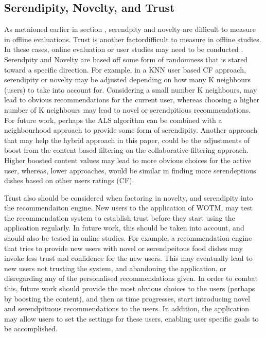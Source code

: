 \subsection{Serendipity, Novelty, and Trust}
As metnioned earlier in section , serendpity and novelty are difficult to measure in offline evaluations. Trust is another factordifficult to measure in offline studies. In these cases, online evaluation or user studies may need to be conducted . Serendpity and Novelty are based off some form of randomness that is stared toward a specific direction. For example, in a KNN user based CF approach, serendipity or novelty may be adjusted depending on how many K neighbours (users) to take into account for. Considering a small number K neighbours, may lead to obvious recommendations for the current user, whereas choosing a higher number of K neighbours may lead to novel or serendpitious recommendations. For future work, perhaps the ALS algorithm can be combined with a neighbourhood approach to provide some form of serendipity. Another approach that may help the hybrid approach in this paper, could be the adjustments of boost from the content-based filtering on the collaborative filtering approach. Higher boosted content values may lead to more obvious choices for the active user, whereas, lower approaches, would be similar in finding more serendeptious dishes based on other users ratings (CF).  

Trust also should be considered when factoring in novelty, and serendipity into the recommendaiton engine. New users to the application of WOTM, may test the recommendation system to establish trust before they start using the application regularly. In future work, this should be taken into account, and should also be tested in online studies. For example, a recommendation engine that tries to provide new users with novel or serendpeitous food dishes may invoke less trust and confidence for the new users. This may eventually lead to new users not trusting the system, and abandoning the application, or disregarding any of the personalised recommendations given. In order to combat this, future work should provide the most obvious choices to the users (perhaps by boosting the content), and then as time progresses, start introducing novel and serendpituous recommendations to the users. In addition, the application may allow users to set the settings for these users, enabling user specific goals to be accomplished. 

